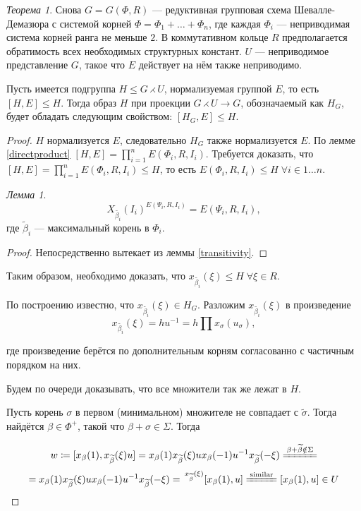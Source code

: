 \documentclass[15pt]{article}
\theoremstyle{remark}
\newtheorem{thm}{Теорема}
\newtheorem{lm}{Лемма}
\begin{document}
\begin{thm}
  Снова $G = G(\Phi, R)$ --- редуктивная групповая схема Шевалле-Демазюра
  с системой корней $\Phi = \Phi_1 + \ldots + \Phi_n$, где каждая $\Phi_i$ --- неприводимая система корней ранга не меньше $2$. В коммутативном кольце $R$ предполагается обратимость всех необходимых структурных констант. $U$ --- неприводимое представление $G$, такое что $E$ действует на нём также неприводимо.
    
  Пусть имеется подгруппа $H \le G \rightthreetimes U$, нормализуемая группой $E$, то есть $[H,E] \le H$. Тогда образ $H$ при проекции $G \rightthreetimes U \rightarrow G$, обозначаемый как $H_G$, будет обладать следующим свойством: $[H_G,E]\le H$.
\end{thm}
\begin{proof}
  $H$ нормализуется $E$, следовательно $H_G$ также нормализуется $E$. По лемме \ref{directproduct} $[H,E] = \prod_{i=1}^n E(\Phi_i,R,I_i)$. Требуется доказать, что $[H,E] = \prod_{i=1}^n E(\Phi_i,R,I_i) \le H$, то есть $ E(\Phi_i,R,I_i) \le H \; \forall i \in 1 \ldots n $.
  
\begin{lm}
  $$X_{\widetilde{\beta_i}}(I_i)^{E(\Psi_i,R,I_i)} = E(\Psi_i,R,I_i),$$
  где $\widetilde{\beta}_i$ --- максимальный корень в $\Phi_i$.
\end{lm}
\begin{proof}
  Непосредственно вытекает из леммы \ref{transitivity}.
\end{proof}

Таким образом, необходимо доказать, что $x_{\widetilde{\beta_i}}(\xi) \le H \; \forall \xi \in R$.

По построению известно, что $x_{\widetilde{\beta_i}}(\xi) \in H_G$.
Разложим $x_{\widetilde{\beta_i}}(\xi)$ в произведение $$x_{\widetilde{\beta_i}}(\xi) = h u^{-1} = h \prod x_\sigma(u_\sigma),$$

где произведение берётся по дополнительным корням согласованно с частичным порядком на них.

Будем по очереди доказывать, что все множители так же лежат в $H$.

Пусть корень $\sigma$ в первом (минимальном) множителе не совпадает с $\widetilde{\sigma}$. Тогда найдётся $\beta \in \Phi^+$, такой что $\beta+\sigma \in \Sigma$. Тогда

$$
w \coloneqq [x_\beta(1), x_{\widetilde{\beta}}(\xi)u] =
x_\beta(1) x_{\widetilde{\beta}}(\xi) u x_\beta(-1) u^{-1} x_{\widetilde{\beta}}(-\xi)
\xlongequal{\beta+\widetilde{\beta}\notin\Sigma}$$
$$=x_\beta(1) x_{\widetilde{\beta}}(\xi) u x_\beta(-1) u^{-1} x_{\widetilde{\beta}}(-\xi) = \,
^{x_{\widetilde{\beta}}(\xi)}[x_\beta(1),u] \xlongequal{\text{similar}} [x_\beta(1),u] \in U
$$ 


\end{proof}
\end{document}
